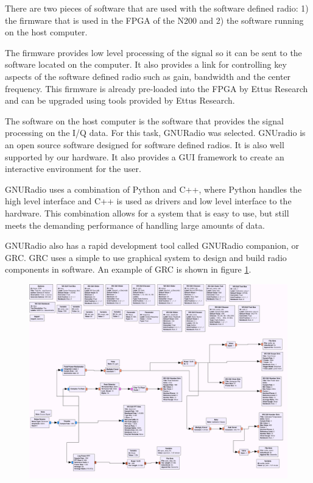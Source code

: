There are two pieces of software that are used with the software defined radio:  1) the firmware that is used in the FPGA of the N200 and 2) the software running on the host computer.  

The firmware provides low level processing of the signal so it can be sent to the software located on the computer.  It also provides a link for controlling key aspects of the software defined radio such as gain, bandwidth and the center frequency.  This firmware is already pre-loaded into the FPGA by Ettus Research and can be upgraded using tools provided by Ettus Research.

The software on the host computer is the software that provides the signal processing on the I/Q data.  For this task, GNURadio was selected.   GNUradio is an open source software designed for software defined radios.  It is also well supported by our hardware.  It also provides a GUI framework to create an interactive environment for the user.   

GNURadio uses a combination of Python and C++, where Python handles the high level interface and C++ is used as drivers and low level interface to the hardware.  This combination allows for a system that is easy to use, but still meets the demanding performance of handling large amounts of data. 

GNURadio also has a rapid development tool called GNURadio companion, or GRC.  GRC uses a simple to use graphical system to design and build radio components in software. An example of GRC is shown in figure \ref{N200_GRC}.

{\begin{figure}[h!tb] \centering
\includegraphics[width=\textwidth]{Images/noisesrc_radiometer.png}
\label{N200_GRC}
\end{figure}
}

